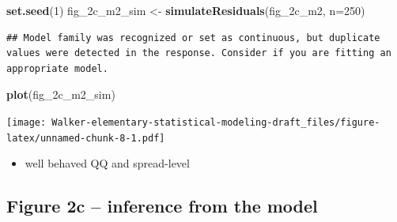 \documentclass[]{book}
\newenvironment{Shaded}{\begin{snugshade}}{\end{snugshade}}
\newcommand{\DataTypeTok}[1]{\textcolor[rgb]{0.13,0.29,0.53}{#1}}
\newcommand{\DecValTok}[1]{\textcolor[rgb]{0.00,0.00,0.81}{#1}}
\newcommand{\ErrorTok}[1]{\textcolor[rgb]{0.64,0.00,0.00}{\textbf{#1}}}
\newcommand{\KeywordTok}[1]{\textcolor[rgb]{0.13,0.29,0.53}{\textbf{#1}}}
\newcommand{\NormalTok}[1]{#1}
\newcommand{\OperatorTok}[1]{\textcolor[rgb]{0.81,0.36,0.00}{\textbf{#1}}}
\newcommand{\OtherTok}[1]{\textcolor[rgb]{0.56,0.35,0.01}{#1}}
\newcommand{\StringTok}[1]{\textcolor[rgb]{0.31,0.60,0.02}{#1}}
\providecommand{\tightlist}{%
  \setlength{\itemsep}{0pt}\setlength{\parskip}{0pt}}
\begin{document}
\begin{Shaded}
\begin{Highlighting}[]
\KeywordTok{set.seed}\NormalTok{(}\DecValTok{1}\NormalTok{)}
\NormalTok{fig_2c_m2_sim  <-}\StringTok{  }\KeywordTok{simulateResiduals}\NormalTok{(fig_2c_m2,  }\DataTypeTok{n=}\DecValTok{250}\NormalTok{)}
\end{Highlighting}
\end{Shaded}

\begin{verbatim}
## Model family was recognized or set as continuous, but duplicate values were detected in the response. Consider if you are fitting an appropriate model.
\end{verbatim}

\begin{Shaded}
\begin{Highlighting}[]
\KeywordTok{plot}\NormalTok{(fig_2c_m2_sim) }
\end{Highlighting}
\end{Shaded}

\texttt{[image: Walker-elementary-statistical-modeling-draft\_files/figure-latex/unnamed-chunk-8-1.pdf]}

\begin{itemize}
\tightlist
\item
  well behaved QQ and spread-level
\end{itemize}

\hypertarget{figure-2c-inference-from-the-model}{%
\subsection{Figure 2c -- inference from the model}\label{figure-2c-inference-from-the-model}}

\begin{Shaded}
\end{Shaded}
\end{document}
